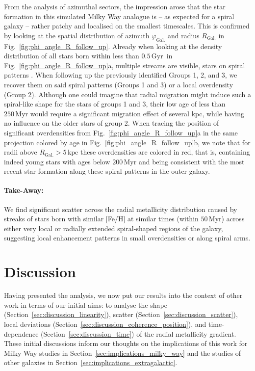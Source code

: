 \documentclass[twocolumn,apj,numberedappendix,appendixfloats]{openjournal}
\newcommand{\nihaoAGEmax}{$0.5\,\mathrm{Gyr}$}
\begin{document}
\begin{CJK*}{UTF8}{gbsn}
From the analysis of azimuthal sectors, the impression arose that the star formation in this simulated Milky Way analogue is -- as expected for a spiral galaxy -- rather patchy and localised on the smallest timescales. This is confirmed by looking at the spatial distribution of azimuth $\varphi_\mathrm{Gal.}$ and radius $R_\mathrm{Gal.}$ in Fig.~\ref{fig:phi_angle_R_follow_up}. Already when looking at the density distribution of all stars born within less than \nihaoAGEmax\ in Fig.~\ref{fig:phi_angle_R_follow_up}a, multiple streams are visible, stars on spiral patterns \citep[see also][]{Chen2024b, Kreckel2019}. When following up the previously identified Groups 1, 2, and 3, we recover them on said spiral patterns (Groups 1 and 3) or a local overdensity (Group 2). Although one could imagine that radial migration might induce such a spiral-like shape for the stars of groups 1 and 3, their low age of less than $250\,\mathrm{Myr}$ would require a significant migration effect of several kpc, while having no influence on the older stars of group 2. When tracing the position of significant overdensities from Fig.~\ref{fig:phi_angle_R_follow_up}a in the same projection colored by age in Fig.~\ref{fig:phi_angle_R_follow_up}b, we note that for radii above $R_\mathrm{Gal.} > 5\,\mathrm{kpc}$ these overdensities are colored in red, that is, containing indeed young stars with ages below $200\,\mathrm{Myr}$ and being consistent with the most recent star formation along these spiral patterns in the outer galaxy.

\paragraph*{Take-Away:} We find significant scatter across the radial metallicity distribution caused by streaks of stars born with similar [Fe/H] at similar times (within $50\,\mathrm{Myr}$) across either very local or radially extended spiral-shaped regions of the galaxy, suggesting local enhancement patterns in small overdensities or along spiral arms.

\section{Discussion} \label{sec:discussion}

Having presented the analysis, we now put our results into the context of other work in terms of our initial aims: to analyse the shape (Section~\ref{sec:discussion_linearity}), scatter (Section~\ref{sec:discussion_scatter}), local deviations (Section~\ref{sec:discussion_coherence_position}), and time-dependence (Section~\ref{sec:discussion_time}) of the radial metallicity gradient. These initial discussions inform our thoughts on the implications of this work for Milky Way studies in Section~\ref{sec:implications_milky_way} and the studies of other galaxies in Section~\ref{sec:implications_extragalactic}.


\end{CJK*}
\end{document}
